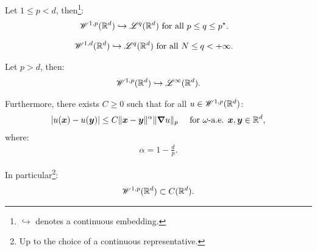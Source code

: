 \begin{corollary}
    Let $1 \leq p < d$, then\footnote{$\hookrightarrow$ denotes a continuous embedding.}:
    \begin{align}
        \mathscr{W}^{1, p}(\mathbb{R}^{d}) \hookrightarrow \mathscr{L}^{q}(\mathbb{R}^{d}) &\text{ for all } p \leq q \leq p^{\star}.
    \end{align}
\end{corollary}

\begin{corollary}
    \begin{align}
        \mathscr{W}^{1, d}(\mathbb{R}^{d}) \hookrightarrow \mathscr{L}^{q}(\mathbb{R}^{d}) &\text{ for all } N \leq q < +\infty.
    \end{align}
\end{corollary}

\begin{theorem}
    Let $p > d$, then:
    \begin{align}
        \mathscr{W}^{1, p}(\mathbb{R}^{d}) \hookrightarrow \mathscr{L}^{\infty}(\mathbb{R}^{d}).
    \end{align}

    Furthermore, there exists $C \geq 0$ such that for all $u \in \mathscr{W}^{1, p}(\mathbb{R}^{d})$:
    \begin{align}
        \lvert u(\bm{x}) - u(\bm{y}) \rvert &\leq C \lVert \bm{x} - \bm{y} \rVert^{\alpha} \lVert \bm{\nabla} u \rVert_p &\text{ for } \omega \text{-a.e. } \bm{x}, \bm{y} \in \mathbb{R}^{d},
    \end{align}
    where:
    \begin{align}
        \alpha = 1 - \frac{d}{p}.
    \end{align}

    In particular\footnote{Up to the choice of a continuous representative.}:
    \begin{align}
        \mathscr{W}^{1, p}(\mathbb{R}^{d}) \subset C(\mathbb{R}^{d}).
    \end{align}
\end{theorem}


